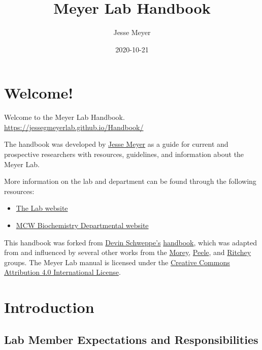 \documentclass[
]{book}
\title{Meyer Lab Handbook}
\author{Jesse Meyer}
\date{2020-10-21}
\providecommand{\tightlist}{%
  \setlength{\itemsep}{0pt}\setlength{\parskip}{0pt}}
\begin{document}
\maketitle

{
\setcounter{tocdepth}{1}
\tableofcontents
}
\hypertarget{welcome}{%
\chapter{Welcome!}\label{welcome}}

Welcome to the Meyer Lab Handbook.
\url{https://jessegmeyerlab.github.io/Handbook/}

The handbook was developed by \href{https://www.jessemeyerlab.com/our-team}{Jesse Meyer} as a guide for current and prospective researchers with resources, guidelines, and information about the Meyer Lab.

More information on the lab and department can be found through the following resources:

\begin{itemize}
\tightlist
\item
  \href{https://www.jessemeyerlab.com}{The Lab website}
\item
  \href{https://www.mcw.edu/departments/biochemistry}{MCW Biochemistry Departmental website}
\end{itemize}

This handbook was forked from \href{https://www.schweppelab.org/}{Devin Schweppe's} \href{https://schweppelab.github.io/Handbook/index.html}{handbook}, which was adapted from and influenced by several other works from the \href{https://ccmorey.github.io/labHandbook/index.html}{Morey}, \href{https://github.com/jpeelle/peellelab_manual/blob/master/peellelab_manual.pdf}{Peele}, and \href{http://www.thememolab.org/resources/}{Ritchey} groups. The Meyer Lab manual is licensed under the \href{https://creativecommons.org/licenses/by/4.0/}{Creative Commons Attribution 4.0 International License}.

\hypertarget{intro}{%
\chapter{Introduction}\label{intro}}

\hypertarget{lab-member-expectations-and-responsibilities}{%
\section{Lab Member Expectations and Responsibilities}\label{lab-member-expectations-and-responsibilities}}
\end{document}
